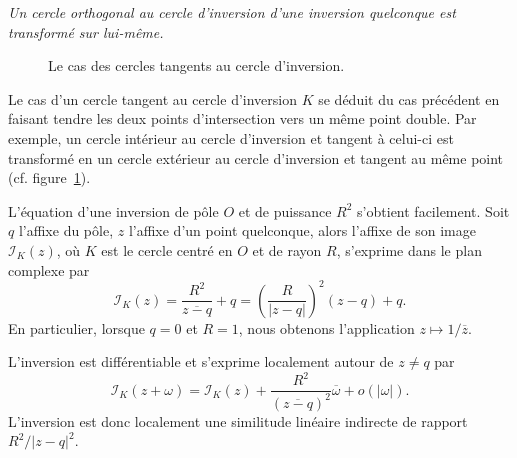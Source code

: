 \emph{Un cercle orthogonal au cercle d'inversion d'une inversion quelconque est transformé sur lui-même.} 
\begin{figure}[ht]
\begin{center}
\shorthandon{!}\shorthandoff{:}
\caption{Le cas des cercles tangents au cercle d'inversion.}\label{fig6}
\end{center}
\end{figure}

  
Le cas d'un cercle tangent au cercle d'inversion $K$ se déduit du cas précédent en faisant tendre les deux points d'intersection vers un même point double. Par exemple, un cercle intérieur au cercle d'inversion et tangent à celui-ci est transformé en un cercle extérieur au cercle d'inversion et tangent au même point (cf. figure~\ref{fig6}).

L'équation d'une inversion de pôle $O$ et de puissance $R^2$ s'obtient facilement. Soit $q$ l'affixe du pôle, $z$ l'affixe d'un point quelconque, alors l'affixe de son image $\mathcal{I}_K(z)$, où $K$ est le cercle centré en $O$ et de rayon $R$, s'exprime dans le plan complexe par 
$$\mathcal{I}_K(z)=\frac{R^2}{\overline{z-q}} + q=\left(\frac{R}{|z-q|}\right)^2(z-q) + q.$$
En particulier, lorsque $q=0$ et $R=1$, nous obtenons l'application $z \mapsto 1/\overline{z}$.

L'inversion est différentiable et s'exprime localement autour de $z \neq q$ par
$$\mathcal{I}_K(z + \omega)=\mathcal{I}_K(z) + \frac{R^2}{(\overline{z-q})^2} \overline{\omega} + o(|\omega|).$$
L'inversion est donc localement une similitude linéaire indirecte de rapport $R^2/|z-q|^2$. 








